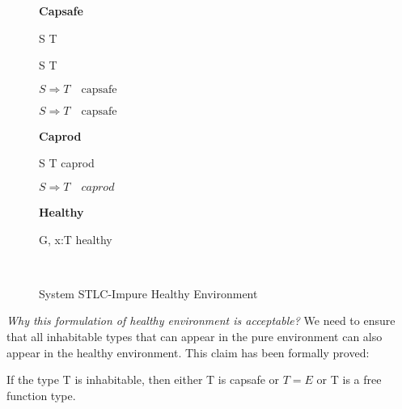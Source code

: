\begin{figure}[h]
\begin{framed}

\setlength{\columnseprule}{0.4pt}
\begin{multicols}{2}

\textbf{Capsafe}


{ S \to T \quad {} }

{ S \to T \quad {} }

{ \colorbox{shade}{$S \Rightarrow T \quad \text{capsafe}$} }

{ \colorbox{shade}{$S \Rightarrow T \quad \text{capsafe}$} }

\columnbreak

\textbf{Caprod}


{ S \to T \quad caprod }

{ \colorbox{shade}{$S \Rightarrow T \quad caprod$} }

\textbf{Healthy}


{ G, \; x:T \quad healthy }

\hfill\\

\end{multicols}
\end{framed}

\caption{System STLC-Impure Healthy Environment}
\label{fig:stlc-impure-healthy-definition}
\end{figure}

\emph{Why this formulation of healthy environment is acceptable?} We
need to ensure that all inhabitable types that can
appear in the pure environment can also appear in the healthy
environment. This claim has been formally proved:

\begin{theorem}
  If the type T is inhabitable, then either T is capsafe or $T = E$ or
  T is a free function type.
\end{theorem}

